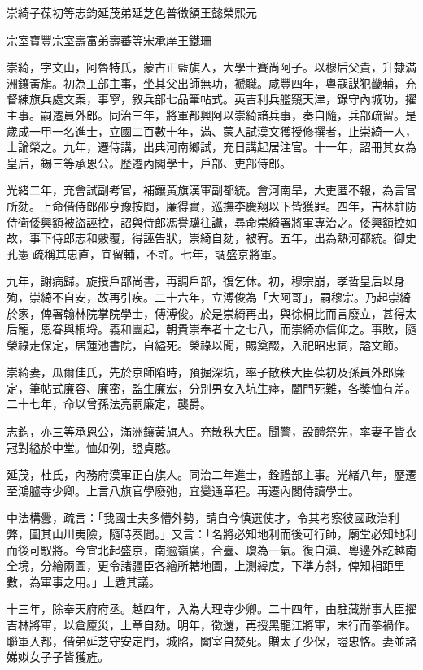 
\begin{pinyinscope}
崇綺子葆初等志鈞延茂弟延芝色普徵額王懿榮熙元

宗室寶豐宗室壽富弟壽蕃等宋承庠王鐵珊

崇綺，字文山，阿魯特氏，蒙古正藍旗人，大學士賽尚阿子。以穆后父貴，升隸滿洲鑲黃旗。初為工部主事，坐其父出師無功，褫職。咸豐四年，粵寇謀犯畿輔，充督練旗兵處文案，事寧，敘兵部七品筆帖式。英吉利兵艦窺天津，錄守內城功，擢主事。嗣遷員外郎。同治三年，將軍都興阿以崇綺諳兵事，奏自隨，兵部疏留。是歲成一甲一名進士，立國二百數十年，滿、蒙人試漢文獲授修撰者，止崇綺一人，士論榮之。九年，遷侍講，出典河南鄉試，充日講起居注官。十一年，詔冊其女為皇后，錫三等承恩公。歷遷內閣學士，戶部、吏部侍郎。

光緒二年，充會試副考官，補鑲黃旗漢軍副都統。會河南旱，大吏匿不報，為言官所劾。上命偕侍郎邵亨豫按問，廉得實，巡撫李慶翔以下皆獲罪。四年，吉林駐防侍衛倭興額被盜誣控，詔與侍郎馮譽驥往讞，尋命崇綺署將軍專治之。倭興額控如故，事下侍郎志和覈覆，得誣告狀，崇綺自劾，被宥。五年，出為熱河都統。御史孔憲疏稱其忠直，宜留輔，不許。七年，調盛京將軍。

九年，謝病歸。旋授戶部尚書，再調戶部，復乞休。初，穆宗崩，孝哲皇后以身殉，崇綺不自安，故再引疾。二十六年，立溥俊為「大阿哥」，嗣穆宗。乃起崇綺於家，俾署翰林院掌院學士，傅溥俊。於是崇綺再出，與徐桐比而言廢立，甚得太后寵，恩眷與桐埒。義和團起，朝貴崇奉者十之七八，而崇綺亦信仰之。事敗，隨榮祿走保定，居蓮池書院，自縊死。榮祿以聞，賜奠醊，入祀昭忠祠，謚文節。

崇綺妻，瓜爾佳氏，先於京師陷時，預掘深坑，率子散秩大臣葆初及孫員外郎廉定，筆帖式廉容、廉密，監生廉宏，分別男女入坑生瘞，闔門死難，各獎恤有差。二十七年，命以曾孫法亮嗣廉定，襲爵。

志鈞，亦三等承恩公，滿洲鑲黃旗人。充散秩大臣。聞警，設醴祭先，率妻子皆衣冠對縊於中堂。恤如例，謚貞愍。

延茂，杜氏，內務府漢軍正白旗人。同治二年進士，銓禮部主事。光緒八年，歷遷至鴻臚寺少卿。上言八旗官學廢弛，宜變通章程。再遷內閣侍讀學士。

中法構釁，疏言：「我國士夫多懵外勢，請自今慎選使才，令其考察彼國政治利弊，圖其山川夷險，隨時奏聞。」又言：「名將必知地利而後可行師，廟堂必知地利而後可馭將。今宜北起盛京，南逾嶺廣，合臺、瓊為一氣。復自滇、粵邊外訖越南全境，分繪兩圖，更令諸疆臣各繪所轄地圖，上測緯度，下準方斜，俾知相距里數，為軍事之用。」上韙其議。

十三年，除奉天府府丞。越四年，入為大理寺少卿。二十四年，由駐藏辦事大臣擢吉林將軍，以倉廩災，上章自劾。明年，徵還，再授黑龍江將軍，未行而拳禍作。聯軍入都，偕弟延芝守安定門，城陷，闔室自焚死。贈太子少保，謚忠恪。妻並諸娣姒女子子皆獲旌。


\end{pinyinscope}
